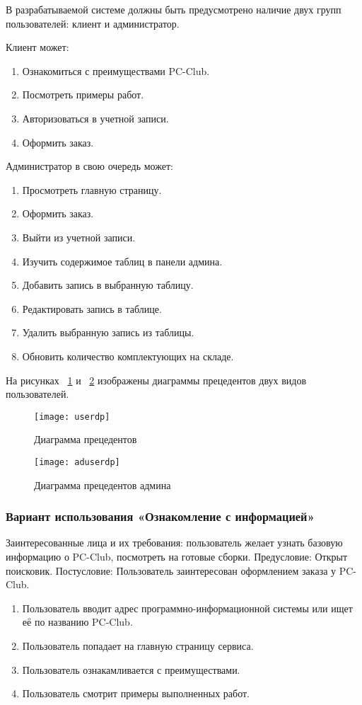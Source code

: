 В разрабатываемой системе должны быть предусмотрено наличие двух групп пользователей: клиент и администратор.

Клиент может:
\begin{enumerate}
	\item Ознакомиться с преимуществами PC-Club.
	\item Посмотреть примеры работ.
	\item Авторизоваться в учетной записи.
	\item Оформить заказ.
\end{enumerate}

Администратор в свою очередь может:
\begin{enumerate}
	\item Просмотреть главную страницу.
	\item Оформить заказ.
	\item Выйти из учетной записи.
	\item Изучить содержимое таблиц в панели админа.
	\item Добавить запись в выбранную таблицу.
	\item Редактировать запись в таблице.
	\item Удалить выбранную запись из таблицы.
	\item Обновить количество комплектующих на складе.
\end{enumerate}

На рисунках ~\ref{userdp:image} и ~\ref{aduserdp:image} изображены диаграммы прецедентов двух видов пользователей.
\begin{figure}[h]
	\texttt{[image: userdp]}
	\caption{Диаграмма прецедентов}
	\label{userdp:image}
\end{figure}
\clearpage
\begin{figure}[h]
	\texttt{[image: aduserdp]}
	\caption{Диаграмма прецедентов админа}
	\label{aduserdp:image}
\end{figure}
\clearpage

\subsubsection{Вариант использования «Ознакомление с информацией»}
Заинтересованные лица и их требования: пользователь желает узнать базовую информацию о PC-Club, посмотреть на готовые сборки.
Предусловие: Открыт поисковик.
Постусловие: Пользователь заинтересован оформлением заказа у PC-Club.
\begin{enumerate}
	\item Пользователь вводит адрес программно-информационной системы или ищет её по названию PC-Club.
	\item Пользователь попадает на главную страницу сервиса.
	\item Пользователь ознакамливается с преимуществами.
	\item Пользователь смотрит примеры выполненных работ.
\end{enumerate}

